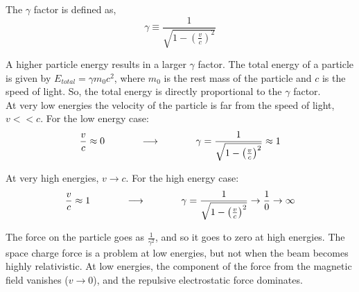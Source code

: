 \documentclass[12pt]{article}
\begin{document}
\begin{flushleft}
The $\gamma$ factor is defined as,
\[
\gamma \equiv \frac{1}{\sqrt{1-\left(\frac{v}{c}\right)^{2}}}
\]

A higher particle energy results in a larger $\gamma$ factor.  The total energy of a particle is given by $E_{total}=\gamma m_{0}c^{2}$, where $m_{0}$ is the rest mass of the particle and $c$ is the speed of light.  So, the total energy is directly proportional to the $\gamma$ factor.\\
\vspace{.2in}
At very low energies the velocity of the particle is far from the speed of light, $v<<c$.  For the low energy case:
\[
\frac{v}{c} \approx 0 \hspace{.5in} \longrightarrow \hspace{.5in} \gamma = \frac{1}{\sqrt{1-\left(\frac{v}{c}\right)^{2}}} \approx 1
\]


At very high energies, $v\rightarrow c$.  For the high energy case:
\[
\frac{v}{c} \approx 1 \hspace{.5in} \longrightarrow \hspace{.5in} \gamma = \frac{1}{\sqrt{1-\left(\frac{v}{c}\right)^{2}}} \rightarrow \frac{1}{0} \rightarrow \infty
\] 

The force on the particle goes as $\frac{1}{\gamma^{2}}$, and so it goes to zero at high energies.  The space charge force is a problem at low energies, but not when the beam becomes highly relativistic.  At low energies, the component of the force from the magnetic field vanishes ($v \rightarrow 0$), and the repulsive electrostatic force dominates.

{\color{grey} \hrulefill}

\end{flushleft}
\end{document}
